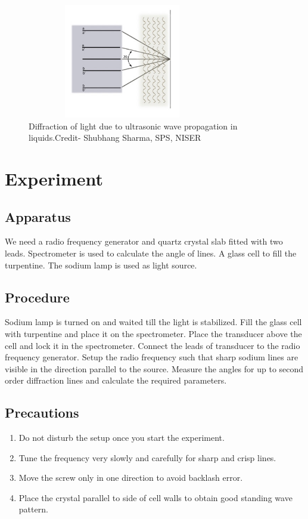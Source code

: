 \documentclass[a4paper, amsfonts, amssymb, amsmath, reprint, showkeys, nofootinbib, twoside]{revtex4-1}
\begin{document}
\begin{figure}[H] %
	\centering
	\includegraphics[width=8.3cm,height=5cm]{0} 
	\caption{Diffraction of light due to ultrasonic wave propagation in liquids.\newline \footnotesize{Credit- Shubhang Sharma, SPS, NISER}}
	\label{0}
\end{figure}

\section{Experiment}
\subsection{Apparatus}
We need a radio frequency generator and quartz crystal slab fitted with two leads. Spectrometer is used to calculate the angle of lines. A glass cell to fill the turpentine. The sodium lamp is used as light source.  
\subsection{Procedure}
Sodium lamp is turned on and waited till the light is stabilized. Fill the glass cell with turpentine and place it on the spectrometer. Place the transducer above the cell and lock it in the spectrometer. Connect the leads of  transducer to the radio frequency generator. Setup the radio frequency such that sharp sodium lines are visible in the direction parallel to the source. Measure the angles for up to second order diffraction lines and calculate the required parameters. 

\subsection{Precautions}
\begin{enumerate}
\item{Do not disturb the setup once you start the experiment.}
\item{Tune the frequency very slowly and carefully for sharp and crisp lines.}
\item{Move the screw only in one direction to avoid backlash error.}
\item {Place the crystal parallel to side of cell walls to obtain good standing wave pattern.}

\end{enumerate}
\end{document}
